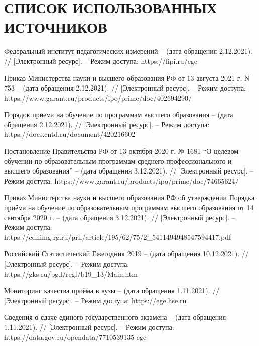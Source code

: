 \section*{СПИСОК ИСПОЛЬЗОВАННЫХ ИСТОЧНИКОВ}

\begingroup
\renewcommand{\section}[2]{}
\begin{thebibliography}{}

	Федеральный институт педагогических измерений – (дата обращения 2.12.2021). // [Электронный ресурс]. – Режим доступа: https://fipi.ru/ege

	Приказ Министерства науки и высшего образования РФ от 13 августа 2021 г. N 753  – (дата обращения 2.12.2021). // [Электронный ресурс]. – Режим доступа: https://www.garant.ru/products/ipo/prime/doc/402694290/

	Порядок приема на обучение по программам высшего образования  – (дата обращения 2.12.2021). // [Электронный ресурс]. – Режим доступа: https://docs.cntd.ru/document/420216602

	Постановление Правительства РФ от 13 октября 2020 г. № 1681 “О целевом обучении по образовательным программам среднего профессионального и высшего образования”  – (дата обращения 3.12.2021). // [Электронный ресурс]. – Режим доступа: https://www.garant.ru/products/ipo/prime/doc/74665624/

	Приказ Министерства науки и высшего образования РФ об утверждении Порядка приёма на обучение по образовательным программам высшего образования от 14 сентября 2020 г. – (дата обращения 3.12.2021). // [Электронный ресурс]. – Режим доступа: https://cdnimg.rg.ru/pril/article/195/62/75/2_5411494948547594417.pdf

	Российский Статистический Ежегодник 2019 – (дата обращения 10.12.2021). // [Электронный ресурс]. – Режим доступа: https://gks.ru/bgd/regl/b19\_13/Main.htm

	Мониторинг качества приёма в вузы – (дата обращения 1.11.2021). // [Электронный ресурс]. – Режим доступа: https://ege.hse.ru

	Сведения о сдаче единого государственного экзамена – (дата обращения 1.11.2021). // [Электронный ресурс]. – Режим доступа: https://data.gov.ru/opendata/7710539135-ege


\end{thebibliography}
